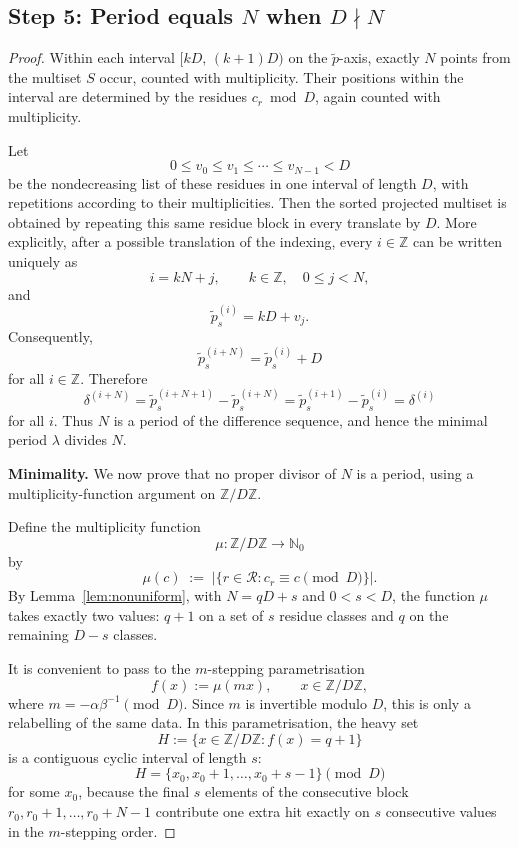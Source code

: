 \documentclass[11pt]{article}
\theoremstyle{plain}
\theoremstyle{definition}
\theoremstyle{remark}
\begin{document}
\subsection{Step 5: Period equals \(N\) when \(D \nmid N\)}
\label{subsec:step5}

\begin{proof}
Within each interval \([kD,\,(k+1)D)\) on the \(\tilde p\)-axis, exactly
\(N\) points from the multiset \(S\) occur, counted with multiplicity.
Their positions within the interval are determined by the residues
\(c_r \bmod D\), again counted with multiplicity.

Let
\[
    0 \le v_0 \le v_1 \le \cdots \le v_{N-1} < D
\]
be the nondecreasing list of these residues in one interval of length \(D\),
with repetitions according to their multiplicities.  Then the sorted
projected multiset is obtained by repeating this same residue block in every
translate by \(D\).  More explicitly, after a possible translation of the
indexing, every \(i \in \mathbb Z\) can be written uniquely as
\[
    i = kN + j,
    \qquad
    k\in\mathbb Z,\quad 0\le j<N,
\]
and
\[
    \tilde p_s^{(i)} = kD + v_j.
\]
Consequently,
\[
    \tilde p_s^{(i+N)}
    =
    \tilde p_s^{(i)} + D
\]
for all \(i\in\mathbb Z\).  Therefore
\[
    \delta^{(i+N)}
    =
    \tilde p_s^{(i+N+1)}-\tilde p_s^{(i+N)}
    =
    \tilde p_s^{(i+1)}-\tilde p_s^{(i)}
    =
    \delta^{(i)}
\]
for all \(i\).  Thus \(N\) is a period of the difference sequence, and hence
the minimal period \(\lambda\) divides \(N\).

\medskip
\noindent\textbf{Minimality.}
We now prove that no proper divisor of \(N\) is a period, using a
multiplicity-function argument on \(\mathbb{Z}/D\mathbb{Z}\).

Define the multiplicity function
\[
    \mu \colon \mathbb{Z}/D\mathbb{Z} \to \mathbb{N}_0
\]
by
\[
    \mu(c) \;:=\; \bigl|\{r \in \mathcal{R} : c_r \equiv c \pmod{D}\}\bigr|.
\]
By Lemma~\ref{lem:nonuniform}, with \(N = qD + s\) and \(0 < s < D\),
the function \(\mu\) takes exactly two values: \(q+1\) on a set of \(s\)
residue classes and \(q\) on the remaining \(D - s\) classes.

It is convenient to pass to the \(m\)-stepping parametrisation
\[
    f(x) := \mu(mx), \qquad x \in \mathbb{Z}/D\mathbb{Z},
\]
where \(m=-\alpha\beta^{-1}\pmod D\).
Since \(m\) is invertible modulo \(D\), this is only a relabelling of the
same data.  In this parametrisation, the heavy set
\[
    H := \{x \in \mathbb{Z}/D\mathbb{Z} : f(x)=q+1\}
\]
is a contiguous cyclic interval of length \(s\):
\[
    H = \{x_0, x_0+1, \ldots, x_0+s-1\}\pmod D
\]
for some \(x_0\), because the final \(s\) elements of the consecutive block
\(r_0,r_0+1,\ldots,r_0+N-1\) contribute one extra hit exactly on \(s\)
consecutive values in the \(m\)-stepping order.


\end{proof}
\end{document}
